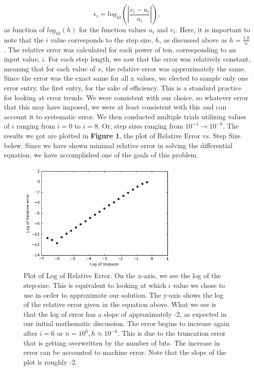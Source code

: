 \documentclass{article}
\begin{document}
\[
\epsilon_i=log_{10}\left(\left|\frac{v_i-u_i}
{u_i}\right|\right),
\]
as function of $log_{10}(h)$ for the function values $u_i$ and $v_i$. Here, it is important to note that the $i$ value corresponds to the step size, $h$, as discussed above as $h = \frac{1.0}{n}$. The relative error was calculated for each power of ten, corresponding to an input value, $i$.
For each step length, we saw that the error was relatively constant, meaning that for each value of $x$, the relative error was approximately the same. Since the error was the exact same for all x values, we elected to sample only one error entry, the first entry, for the sake of efficiency. This is a standard practice for looking at error trends. We were consistent with our choice, so whatever error that this may have imposed, we were at least consistent with this and can account it to systematic error. We then conducted multiple trials utilizing values of $i$ ranging from $i=0$ to $i=8$. Or, step sizes ranging from $10^{-1} \rightarrow 10^{-8}$. The results we got are plotted in \textbf{Figure 1}, the plot of Relative Error vs. Step Size below. Since we have shown minimal relative error in solving the differential equation, we have accomplished one of the goals of this problem.

\begin{figure}[h!]
	\centering
	\includegraphics[width=8cm]{PHY480_P1_RerrvSs.png}
	\caption{Plot of Log of Relative Error. On the x-axis, we see the log of the step-size. This is equivalent to looking at which $i$ value we chose to use in order to approximate our solution. The y-axis shows the log of the relative error given in the equation above. What we see is that the log of error has a slope of approximately -2, as expected in our initial mathematic discussion. The error begins to increase again after $i=6$ or $n=10^{6}, h \approx 10^{-6}$. This is due to the truncation error that is getting overwritten by the number of bits. The increase in error can be accounted to machine error. Note that the slope of the plot is roughly -2.}
	\label{fig:errorplot}
\end{figure}
\end{document}
